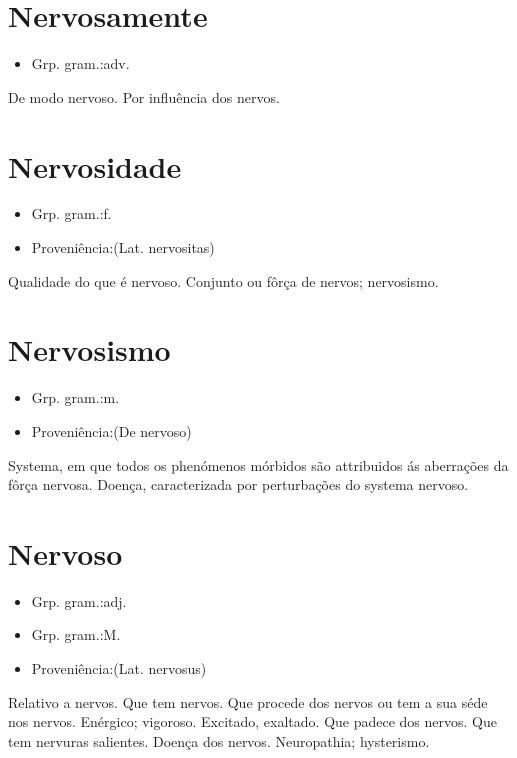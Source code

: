 \section{Nervosamente}
\begin{itemize}
\item {Grp. gram.:adv.}
\end{itemize}
De modo nervoso.
Por influência dos nervos.
\section{Nervosidade}
\begin{itemize}
\item {Grp. gram.:f.}
\end{itemize}
\begin{itemize}
\item {Proveniência:(Lat. \textunderscore nervositas\textunderscore )}
\end{itemize}
Qualidade do que é nervoso.
Conjunto ou fôrça de nervos; nervosismo.
\section{Nervosismo}
\begin{itemize}
\item {Grp. gram.:m.}
\end{itemize}
\begin{itemize}
\item {Proveniência:(De \textunderscore nervoso\textunderscore )}
\end{itemize}
Systema, em que todos os phenómenos mórbidos são attribuidos ás aberrações da fôrça nervosa.
Doença, caracterizada por perturbações do systema nervoso.
\section{Nervoso}
\begin{itemize}
\item {Grp. gram.:adj.}
\end{itemize}
\begin{itemize}
\item {Grp. gram.:M.}
\end{itemize}
\begin{itemize}
\item {Proveniência:(Lat. \textunderscore nervosus\textunderscore )}
\end{itemize}
Relativo a nervos.
Que tem nervos.
Que procede dos nervos ou tem a sua séde nos nervos.
Enérgico; vigoroso.
Excitado, exaltado.
Que padece dos nervos.
Que tem nervuras salientes.
Doença dos nervos.
Neuropathia; hysterismo.
